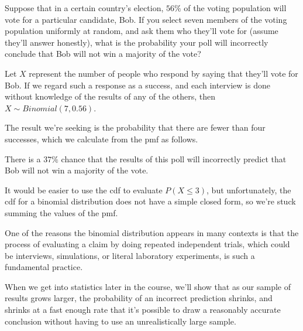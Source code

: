 \begin{examp}Suppose that in a certain country's election, $56\%$ of the voting population will vote for a particular candidate, Bob. If you select seven members of the voting population uniformly at random, and ask them who they'll vote for (assume they'll answer honestly), what is the probability your poll will incorrectly conclude that Bob will not win a majority of the vote?
\par
\noindent Let $X$ represent the number of people who respond by saying that they'll vote for Bob. If we regard such a response as a success, and each interview is done without knowledge of the results of any of the others, then $X \sim Binomial(7, 0.56)$.
\par
\noindent The result we're seeking is the probability that there are fewer than four successes, which we calculate from the pmf as follows.
\par
\noindent There is a $37\%$ chance that the results of this poll will incorrectly predict that Bob will not win a majority of the vote.
\end{examp}
\par
\rmk It would be easier to use the cdf to evaluate $P(X \leq 3)$, but unfortunately, the cdf for a binomial distribution does not have a simple closed form, so we're stuck summing the values of the pmf.
\par
One of the reasons the binomial distribution appears in many contexts is that the process of evaluating a claim by doing repeated independent trials, which could be interviews, simulations, or literal laboratory experiments, is such a fundamental practice.
\par
When we get into statistics later in the course, we'll show that as our sample of results grows larger, the probability of an incorrect prediction shrinks, and shrinks at a fast enough rate that it's possible to draw a reasonably accurate conclusion without having to use an unrealistically large sample.

